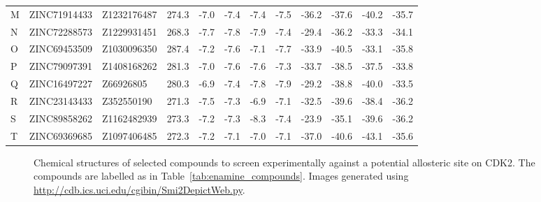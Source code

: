 \begin{sidewaystable}
\begin{small}
\begin{tabular}{lllrrrrrrrrr}
M     & ZINC71914433 & Z1232176487 & 274.3 & -7.0  & -7.4  & -7.4  & -7.5  & -36.2 & -37.6 & -40.2 & -35.7 \\
N     & ZINC72288573 & Z1229931451 & 268.3 & -7.7  & -7.8  & -7.9  & -7.4  & -29.4 & -36.2 & -33.3 & -34.1 \\
O     & ZINC69453509 & Z1030096350 & 287.4 & -7.2  & -7.6  & -7.1  & -7.7  & -33.9 & -40.5 & -33.1 & -35.8 \\
P     & ZINC79097391 & Z1408168262 & 281.3 & -7.0  & -7.6  & -7.6  & -7.3  & -33.7 & -38.5 & -37.5 & -33.8 \\
Q     & ZINC16497227 & Z66926805   & 280.3 & -6.9  & -7.4  & -7.8  & -7.9  & -29.2 & -38.8 & -40.0 & -33.5 \\
R     & ZINC23143433 & Z352550190  & 271.3 & -7.5  & -7.3  & -6.9  & -7.1  & -32.5 & -39.6 & -38.4 & -36.2 \\
S     & ZINC89858262 & Z1162482939 & 273.3 & -7.2  & -7.3  & -8.3  & -7.4  & -23.9 & -35.1 & -39.6 & -36.2 \\
T     & ZINC69369685 & Z1097406485 & 272.3 & -7.2  & -7.1  & -7.0  & -7.1  & -37.0 & -40.6 & -43.1 & -35.6 \\
\hline
\end{tabular}
\end{small}

\caption{Selected compounds to screen experimentally against a potential allosteric site on CDK2.
ZINC12 ID is the ID in the ZINC12 database (\url{http://zinc.docking.org/}).
Enamine ID is the ID at Enamine Ltd (\url{http://www.enamine.net}).
The AutoDock Vina best energy and DOCK best grid score are shown for each ligand docked to four structures:
(A) 3PXF,
(B) 4EZ7,
(C) ExProSE pocket open structure from 3PXF,
(D) ExProSE pocket open structure from 4EZ7.}

\label{tab:enamine_compounds}
\end{sidewaystable}


\begin{figure}
\centering


\caption{Chemical structures of selected compounds to screen experimentally against a potential allosteric site on CDK2.
The compounds are labelled as in Table~\ref{tab:enamine_compounds}.
Images generated using \url{http://cdb.ics.uci.edu/cgibin/Smi2DepictWeb.py}.}

\label{fig:compound_structures}
\end{figure}


